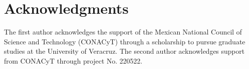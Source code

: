 \documentclass[conference]{IEEEtran}
\theoremstyle{definition}
\begin{document}
\section*{Acknowledgments} %
The first author acknowledges the support of the Mexican National Council of Science
and Technology (CONACyT) through a scholarship to pursue graduate studies at the
University of Veracruz. The second author acknowledges support from CONACyT through
project No. 220522. 






\end{document}
